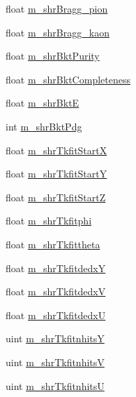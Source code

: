 \begin{DoxyCompactItemize}
\item 
float \hyperlink{classselection_1_1CCincSelection_aeb3ad1e13e9e94fb9096d40f8c576a6a}{m\-\_\-shr\-Bragg\-\_\-pion}
\item 
float \hyperlink{classselection_1_1CCincSelection_a44d88e3b197705450db2becfae327827}{m\-\_\-shr\-Bragg\-\_\-kaon}
\item 
float \hyperlink{classselection_1_1CCincSelection_a95079e8ae0cb7d55594d64812d24327c}{m\-\_\-shr\-Bkt\-Purity}
\item 
float \hyperlink{classselection_1_1CCincSelection_ae50845633aef1725ac8c894101041f54}{m\-\_\-shr\-Bkt\-Completeness}
\item 
float \hyperlink{classselection_1_1CCincSelection_a0a43f7b976987cc6d13389a589c561e2}{m\-\_\-shr\-Bkt\-E}
\item 
int \hyperlink{classselection_1_1CCincSelection_aa11fee829a174ef4b6f92041edb990cf}{m\-\_\-shr\-Bkt\-Pdg}
\item 
float \hyperlink{classselection_1_1CCincSelection_a0bab1ed8cdf12861136bd47a6d48c7ad}{m\-\_\-shr\-Tkfit\-Start\-X}
\item 
float \hyperlink{classselection_1_1CCincSelection_aeff05af138a16a516e5413e21b6bcdf1}{m\-\_\-shr\-Tkfit\-Start\-Y}
\item 
float \hyperlink{classselection_1_1CCincSelection_a9c1c8138a2febe952478d15845ca8846}{m\-\_\-shr\-Tkfit\-Start\-Z}
\item 
float \hyperlink{classselection_1_1CCincSelection_af760bcbc586c53183f9ed2d5359b028a}{m\-\_\-shr\-Tkfitphi}
\item 
float \hyperlink{classselection_1_1CCincSelection_a9fa1d825a900a4081323091daa9b0aa7}{m\-\_\-shr\-Tkfittheta}
\item 
float \hyperlink{classselection_1_1CCincSelection_aa619cb73a3bb42251eaf5b35445e788b}{m\-\_\-shr\-Tkfitdedx\-Y}
\item 
float \hyperlink{classselection_1_1CCincSelection_afd1502883efc2504917a3b17eeb4aa46}{m\-\_\-shr\-Tkfitdedx\-V}
\item 
float \hyperlink{classselection_1_1CCincSelection_aaa3a14c43d0e840fa3032a46bd498db1}{m\-\_\-shr\-Tkfitdedx\-U}
\item 
uint \hyperlink{classselection_1_1CCincSelection_a63f55e51e3df0e108aace93b3c34c153}{m\-\_\-shr\-Tkfitnhits\-Y}
\item 
uint \hyperlink{classselection_1_1CCincSelection_a8ad70697906b08285a218c739e8c4815}{m\-\_\-shr\-Tkfitnhits\-V}
\item 
uint \hyperlink{classselection_1_1CCincSelection_a3617f2e35ecc3cd9ceb53108b4c288cb}{m\-\_\-shr\-Tkfitnhits\-U}

\end{DoxyCompactItemize}
